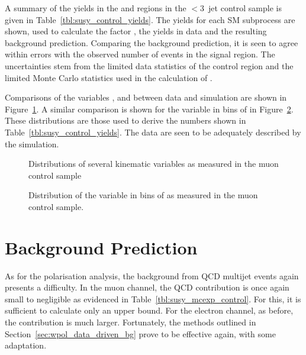 A summary of the yields in the \LPcontrol and \LPsignal regions in the $<3$~jet
control sample is given in Table~\ref{tbl:susy_control_yields}. The yields for
each \ac{SM} subprocess are shown, used to calculate the factor \RCS, the yields
in data and the resulting background prediction. Comparing the background
prediction, it is seen to agree within errors with the observed number of events
in the signal region. The uncertainties stem from the limited data statistics of
the control region and the limited Monte Carlo statistics used in the
calculation of \RCS.



Comparisons of the variables \STlep, \MT and \Ptmu between data and simulation
are shown in Figure~\ref{fig:susy_mucontrol_kin}. A similar comparison is shown
for the \LP variable in bins of \STlep in
Figure~\ref{fig:susy_mucontrol_lp}. These distributions are those used to derive
the numbers shown in Table~\ref{tbl:susy_control_yields}. The data are seen to
be adequately described by the simulation.
\begin{figure}
\centering
{}\quad
{}\quad
{}
\caption[]{Distributions of several kinematic variables as measured in the muon control sample}
\label{fig:susy_mucontrol_kin}
\end{figure}

\begin{figure}
\centering
{}\quad
{}\quad
{}
\caption{Distribution of the \LP variable in bins of \STlep as measured in the muon control sample.}
\label{fig:susy_mucontrol_lp}
\end{figure}

\section{Background Prediction}
As for the \PW polarisation analysis, the background from \ac{QCD} multijet
events again presents a difficulty. In the muon channel, the \ac{QCD}
contribution is once again small to negligible as evidenced in
Table~\ref{tbl:susy_mcexp_control}. For this, it is sufficient to calculate
only an upper bound. For the electron channel, as before, the contribution is
much larger. Fortunately, the methods outlined in
Section~\ref{sec:wpol_data_driven_bg} prove to be effective again, with some
adaptation.


